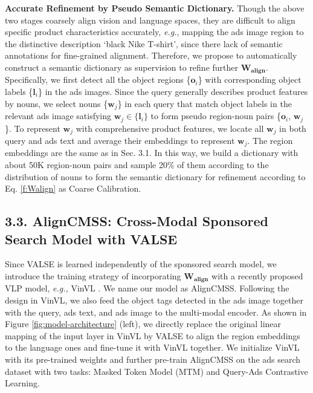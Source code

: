 \documentclass[letterpaper]{article} \usepackage{aaai24}  \usepackage{times}  \usepackage{helvet}  \usepackage{courier}  \usepackage[hyphens]{url}  \usepackage{graphicx} \urlstyle{rm} \def\UrlFont{\rm}  \usepackage{natbib}  \usepackage{caption} \frenchspacing  \setlength{\pdfpagewidth}{8.5in}  \setlength{\pdfpageheight}{11in}
\begin{document}
\noindent\textbf{Accurate Refinement by Pseudo Semantic Dictionary.} 
Though the above two stages coarsely align vision and language spaces, they are difficult to align specific product characteristics accurately, \textit{e.g.}, mapping the ads image region to the distinctive description `black Nike T-shirt', since there lack of semantic annotations for fine-grained alignment. Therefore, we propose to automatically construct a semantic dictionary as supervision to refine further $\boldsymbol{W_{align}}$. Specifically, we first detect all the object regions \{$\boldsymbol{o}_i$\} with corresponding object labels \{$\boldsymbol{l}_i$\} in the ads images. Since the query generally describes product features by nouns, we select nouns \{$\boldsymbol{w}_j$\} in each query that match object labels in the relevant ads image satisfying $\boldsymbol{w}_j \in  \{\boldsymbol{l}_i\}$ to form pseudo region-noun pairs \{$\boldsymbol{o}_i$, $\boldsymbol{w}_j$\}. To represent $\boldsymbol{w}_j$ with comprehensive product features, we locate all $\boldsymbol{w}_j$ in both query and ads text and average their embeddings to represent $\boldsymbol{w}_j$. The region embeddings are the same as in Sec. 3.1. In this way, we build a dictionary with about 50K region-noun pairs and sample 20\% of them according to the distribution of nouns to form the semantic dictionary for refinement according to Eq. \ref{f:Walign} as Coarse Calibration.  

\subsection{3.3. AlignCMSS: Cross-Modal Sponsored Search Model with VALSE}
\label{ssec:search model}
Since VALSE is learned independently of the sponsored search model, we introduce the training strategy of incorporating $\boldsymbol{W_{align}}$ with a recently proposed VLP model, \textit{e.g.,} VinVL \cite{zhang2021vinvl}. We name our model as AlignCMSS. Following the design in VinVL, we also feed the object tags detected in the ads image together with the query, ads text, and ads image to the multi-modal encoder. As shown in Figure \ref{fig:model-architecture} (left), we directly replace the original linear mapping of the input layer in VinVL by VALSE to align the region embeddings to the language ones and fine-tune it with VinVL together. We initialize VinVL with its pre-trained weights and further pre-train AlignCMSS on the ads search dataset with two tasks: Masked Token Model (MTM) and Query-Ads Contrastive Learning.   
\end{document}
